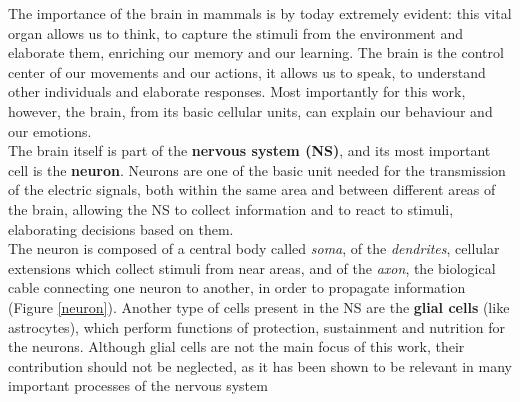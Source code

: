 \documentclass[12pt, a4paper]{report}
\begin{document}
	The importance of the brain in mammals is by today extremely evident: this vital organ allows us to think,  to capture the stimuli from the environment and elaborate them, enriching our memory and  our learning. The brain is the control center of our movements and our actions, it allows us to speak, to understand other individuals and elaborate responses. Most importantly for this work, however, the brain, from its basic cellular units, can explain our behaviour and our emotions. \\

	
	The brain itself is part of the \textbf{nervous system (NS)}, and its most important cell is the \textbf{neuron}.	Neurons are one of the basic unit needed for the transmission of
	the electric signals, both within the same area and between different areas of
	the brain, allowing the NS to collect information and to react to stimuli,
	elaborating decisions based on them. \\
	The neuron is composed of a central body called \textit{soma}, of the \textit{dendrites}, cellular extensions which collect stimuli from near areas, and of the \textit{axon}, the biological cable connecting one neuron to another, in order to propagate information (Figure \ref{neuron}). 
	Another type of cells present in the NS are the \textbf{glial cells} (like astrocytes), which perform functions of protection, sustainment and nutrition for the neurons. Although glial cells are not the main focus of this work, their contribution should not be neglected, as it has been shown to be relevant in many important processes of the nervous system \cite{1} %
	
		
	
\end{document}
